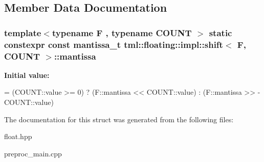 \subsection{Member Data Documentation}
\hypertarget{structtml_1_1floating_1_1impl_1_1shift_ae986ba9199a212b4af8093aaaa0910ad}{
\subsubsection[{mantissa}]{\setlength{\rightskip}{0pt plus 5cm}template$<$typename F , typename C\+O\+U\+N\+T $>$ static constexpr const mantissa\+\_\+t {\bf tml\+::floating\+::impl\+::shift}$<$ F, C\+O\+U\+N\+T $>$\+::mantissa\hspace{0.3cm}{\ttfamily [static]}}}\label{structtml_1_1floating_1_1impl_1_1shift_ae986ba9199a212b4af8093aaaa0910ad}
{\bfseries Initial value\+:}
\begin{DoxyCode}
= (COUNT::value >= 0) ? (F::mantissa << COUNT::value) :
                                                                                   (F::mantissa >> -
      COUNT::value)
\end{DoxyCode}


The documentation for this struct was generated from the following files\+:\begin{DoxyCompactItemize}
\item 
float.\+hpp\item 
preproc\+\_\+main.\+cpp\end{DoxyCompactItemize}
